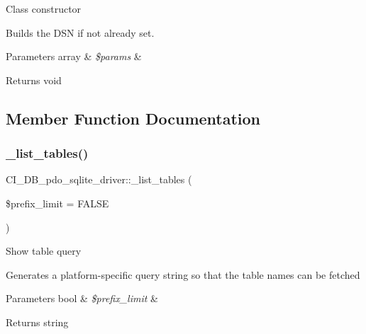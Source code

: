 Class constructor

Builds the D\+SN if not already set.


\begin{DoxyParams}[1]{Parameters}
array & {\em \$params} & \\
\hline
\end{DoxyParams}
\begin{DoxyReturn}{Returns}
void 
\end{DoxyReturn}


\subsection{Member Function Documentation}
\mbox{\label{class_c_i___d_b__pdo__sqlite__driver_ae1ffa509973054db50f18010e81ee3de}} 
\subsubsection{\texorpdfstring{\+\_\+list\+\_\+tables()}{\_list\_tables()}}
{\footnotesize\ttfamily C\+I\+\_\+\+D\+B\+\_\+pdo\+\_\+sqlite\+\_\+driver\+::\+\_\+list\+\_\+tables (\begin{DoxyParamCaption}\item[{}]{\$prefix\+\_\+limit = {\ttfamily FALSE} }\end{DoxyParamCaption})\hspace{0.3cm}{\ttfamily [protected]}}

Show table query

Generates a platform-\/specific query string so that the table names can be fetched


\begin{DoxyParams}[1]{Parameters}
bool & {\em \$prefix\+\_\+limit} & \\
\hline
\end{DoxyParams}
\begin{DoxyReturn}{Returns}
string 
\end{DoxyReturn}
\mbox{\label{class_c_i___d_b__pdo__sqlite__driver_ac066761e4ff5833db71c4384a59270c4}} 
